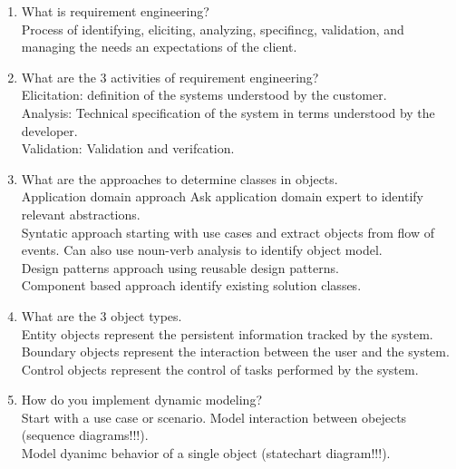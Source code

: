 \documentclass[10pt]{article}
\begin{document}
\begin{enumerate}
      \item What is requirement engineering?\\
            Process of identifying, eliciting, analyzing, specifincg, validation, and managing the needs an expectations of the client.\\

      \item What are the 3 activities of requirement engineering?\\
            Elicitation: definition of the systems understood by the customer.\\
            Analysis: Technical specification of the system in terms understood by the developer.\\
            Validation: Validation and verifcation.\\

      \item What are the approaches to determine classes in objects.\\
            Application domain approach Ask application domain expert to identify relevant abstractions.\\
            Syntatic approach starting with use cases and extract objects from flow of events. Can also use noun-verb analysis to identify object model.\\
            Design patterns approach using reusable design patterns.\\
            Component based approach identify existing solution classes.\\

      \item What are the 3 object types.\\
            Entity objects represent the persistent information tracked by the system.\\
            Boundary objects represent the interaction between the user and the system.\\
            Control objects represent the control of tasks performed by the system.\\

      \item How do you implement dynamic modeling?\\
            Start with a use case or scenario. Model interaction between obejects (sequence diagrams!!!).\\
            Model dyanimc behavior of a single object (statechart diagram!!!).\\
\end{enumerate}
\end{document}
